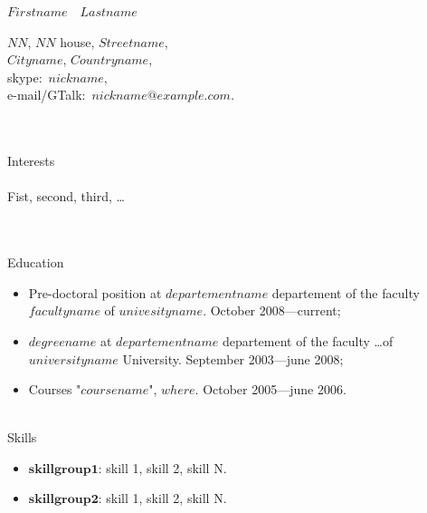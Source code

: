 \documentclass{article}
\begin{document}
\begin{center}{\LARGE $First name$~~$Last name$}\end{center}

\vspace{15pt}


\noindent $NN$, $NN$ house, $Street name$,\\
$City name$, $Country name$,\\
skype:~{\it $nickname$},\\
e-mail/GTalk:~{\it $nickname@example.com$.}


\noindent \\\\ {\Large Interests}\\\\
Fist, second, third, \ldots


\noindent \\\\ {\Large Education}
\begin{itemize}
    \item Pre-doctoral position at $departement name$ departement of the faculty $faculty name$ of $univesity name$. October 2008---current;
    \item $degree name$ at $departement name$ departement of the faculty
    \ldots of $university name$ University. September 2003---june 2008;
    \item Courses "$course name$", $where$. October 2005---june 2006.
\end{itemize}


\noindent \\ {\Large Skills}
\begin{itemize}
    \item $\textbf{skillgroup1:}$ skill 1, skill 2, skill N.
    \item $\textbf{skillgroup2:}$ skill 1, skill 2, skill N.
\end{itemize}
\end{document}
